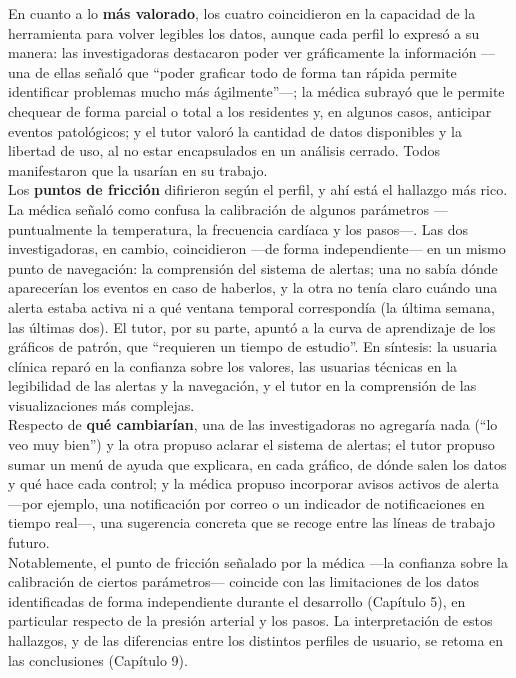 En cuanto a lo \textbf{más valorado}, los cuatro coincidieron en la capacidad de la herramienta para volver legibles los datos, aunque cada perfil lo expresó a su manera: las investigadoras destacaron poder ver gráficamente la información —una de ellas señaló que “poder graficar todo de forma tan rápida permite identificar problemas mucho más ágilmente”—; la médica subrayó que le permite chequear de forma parcial o total a los residentes y, en algunos casos, anticipar eventos patológicos; y el tutor valoró la cantidad de datos disponibles y la libertad de uso, al no estar encapsulados en un análisis cerrado. Todos manifestaron que la usarían en su trabajo.\\

Los \textbf{puntos de fricción} difirieron según el perfil, y ahí está el hallazgo más rico. La médica señaló como confusa la calibración de algunos parámetros —puntualmente la temperatura, la frecuencia cardíaca y los pasos—. Las dos investigadoras, en cambio, coincidieron —de forma independiente— en un mismo punto de navegación: la comprensión del sistema de alertas; una no sabía dónde aparecerían los eventos en caso de haberlos, y la otra no tenía claro cuándo una alerta estaba activa ni a qué ventana temporal correspondía (la última semana, las últimas dos). El tutor, por su parte, apuntó a la curva de aprendizaje de los gráficos de patrón, que “requieren un tiempo de estudio”. En síntesis: la usuaria clínica reparó en la confianza sobre los valores, las usuarias técnicas en la legibilidad de las alertas y la navegación, y el tutor en la comprensión de las visualizaciones más complejas.\\

Respecto de \textbf{qué cambiarían}, una de las investigadoras no agregaría nada (“lo veo muy bien”) y la otra propuso aclarar el sistema de alertas; el tutor propuso sumar un menú de ayuda que explicara, en cada gráfico, de dónde salen los datos y qué hace cada control; y la médica propuso incorporar avisos activos de alerta —por ejemplo, una notificación por correo o un indicador de notificaciones en tiempo real—, una sugerencia concreta que se recoge entre las líneas de trabajo futuro.\\

Notablemente, el punto de fricción señalado por la médica —la confianza sobre la calibración de ciertos parámetros— coincide con las limitaciones de los datos identificadas de forma independiente durante el desarrollo (Capítulo 5), en particular respecto de la presión arterial y los pasos. La interpretación de estos hallazgos, y de las diferencias entre los distintos perfiles de usuario, se retoma en las conclusiones (Capítulo 9).\\


